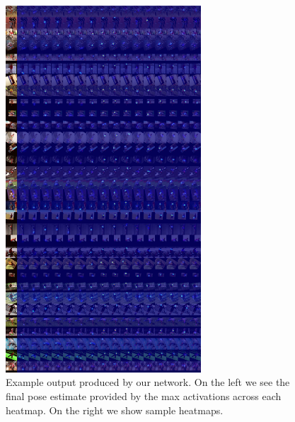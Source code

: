 \documentclass[final]{cvpr}
\begin{document}
\begin{figure}[h]
\centering
\includegraphics[width=0.65\textwidth]{heatmap.jpg}
\caption{Example output produced by our network. On the left we see the final pose estimate provided by the max activations across each heatmap. On the right we show sample heatmaps.}
\end{figure}
\end{document}
